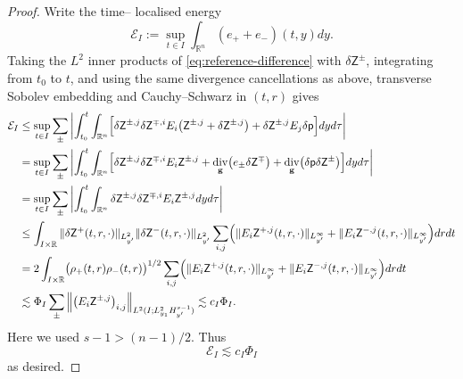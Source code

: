 \documentclass[11pt,reqno]{amsart}
\theoremstyle{plain}
\theoremstyle{definition}
\theoremstyle{remark}
\numberwithin{equation}{section}
\DeclareMathOperator{\Div}{div}
\newcommand{\gmetric}{\mathbf g}
\newcommand{\Real}{\mathbb R}
\newcommand{\Rn}{\Real^n}
\begin{document}
\begin{proof}
Write the time-- localised energy
\[
 \mathcal E_I
 :=\sup_{t\in I}\int_{\Rn}(e_++e_-)(t,y) dy.
\]
Taking the $L^2$ inner products of \eqref{eq:reference-difference} with
$\delta\mathsf Z^\pm$, integrating from $t_0$ to $t$, and using the same
divergence cancellations as above, transverse Sobolev embedding and
Cauchy--Schwarz in $(t,r)$ gives
\[
\begin{aligned}
\mathcal E_I
&\leq
\sup_{t\in I}\sum_{\pm}
\left|
\int_{t_0}^{t}\int_{\Rn}
\Bigl[
\delta\mathsf Z^{\pm,j}\delta\mathsf Z^{\mp,i}
E_i\bigl(\mathsf Z^{\pm,j}+\delta\mathsf Z^{\pm,j}\bigr)
+\delta\mathsf Z^{\pm,j}E_j\delta\mathsf p
\Bigr] dy d\tau
\right|                                                        \\
&=
\sup_{t\in I}\sum_{\pm}
\left|
\int_{t_0}^{t}\int_{\Rn}
\Bigl[
\delta\mathsf Z^{\pm,j}\delta\mathsf Z^{\mp,i}
E_i\mathsf Z^{\pm,j}
+\Div_{\gmetric}\bigl(e_\pm\delta\mathsf Z^\mp\bigr)
+\Div_{\gmetric}\bigl(\delta\mathsf p \delta\mathsf Z^\pm\bigr)
\Bigr] dy d\tau
\right|                                                        \\
&=
\sup_{t\in I}\sum_{\pm}
\left|
\int_{t_0}^{t}\int_{\Rn}
\delta\mathsf Z^{\pm,j}\delta\mathsf Z^{\mp,i}
E_i\mathsf Z^{\pm,j} dy d\tau
\right|                                                        \\
&\leq
\int_{I\times\Real}
\|\delta\mathsf Z^+(t,r,\cdot)\|_{L^2_{y'}}
\|\delta\mathsf Z^-(t,r,\cdot)\|_{L^2_{y'}}
\sum_{i,j}\Bigl(
\|E_i\mathsf Z^{+,j}(t,r,\cdot)\|_{L^\infty_{y'}}
+\|E_i\mathsf Z^{-,j}(t,r,\cdot)\|_{L^\infty_{y'}}
\Bigr) dr dt                                                \\
&=
2\int_{I\times\Real}
\bigl(\rho_+(t,r)\rho_-(t,r)\bigr)^{1/2}
\sum_{i,j}\Bigl(
\|E_i\mathsf Z^{+,j}(t,r,\cdot)\|_{L^\infty_{y'}}
+\|E_i\mathsf Z^{-,j}(t,r,\cdot)\|_{L^\infty_{y'}}
\Bigr) dr dt                                                \\
&\lesssim
\Phi_I
\sum_{\pm}
\left\|
\bigl(E_i\mathsf Z^{\pm,j}\bigr)_{i,j}
\right\|_{L^2(I;L^2_{y_1}H^{s-1}_{y'})}
\lesssim c_I\Phi_I .
\end{aligned}
\]
Here we used $s-1>(n-1)/2$.  Thus
\begin{equation}\label{eq:energy-by-interaction}
 \mathcal E_I\lesssim c_I\Phi_I
\end{equation}
as desired.


\end{proof}
\end{document}
